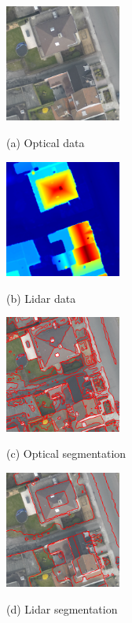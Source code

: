 \documentclass{article}
\begin{document}
\begin{figure}[htb]
  \begin{minipage}[b]{0.48\linewidth}
    \centering
    \centerline{\includegraphics[width=3.8cm]{./Images/DFC2015/optical.png}}
    \centerline{(a) Optical data}\medskip
  \end{minipage}
%
  \begin{minipage}[b]{.48\linewidth}
    \centering
    \centerline{\includegraphics[width=3.8cm]{./Images/DFC2015/lidarColor.png}}
    \centerline{(b) Lidar data}\medskip
  \end{minipage}

  \begin{minipage}[b]{.48\linewidth}
    \centering
    \centerline{\includegraphics[width=3.8cm]{./Images/DFC2015/opticalOnly.png}}
    \centerline{(c) Optical segmentation}\medskip
  \end{minipage}
%
  \begin{minipage}[b]{.48\linewidth}
    \centering
    \centerline{\includegraphics[width=3.8cm]{./Images/DFC2015/lidarOnly.png}}
    \centerline{(d) Lidar segmentation}\medskip
  \end{minipage}


\end{figure}
\end{document}
